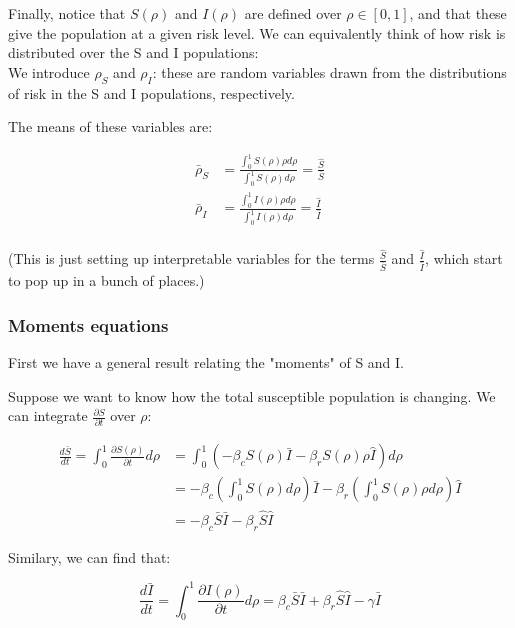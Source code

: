 \documentclass{article}
\begin{document}
Finally, notice that $S(\rho)$ and $I(\rho)$ are defined over $\rho \in [0, 1]$,
and that these give the population at a given risk level. We can equivalently
think of how risk is distributed over the S and I populations:\\

We introduce $\rho_S$ and $\rho_I$: these are random variables drawn from
the distributions of risk in the S and I populations, respectively.

The means of these variables are:

\begin{align*}
\bar\rho_S
&= \frac{\int_{0}^{1} S(\rho) \rho d\rho}{\int_{0}^{1} S(\rho) d\rho}
= \frac{\hat S}{\bar S}\\
\bar\rho_I
&= \frac{\int_{0}^{1} I(\rho) \rho d\rho}{\int_{0}^{1} I(\rho) d\rho}
= \frac{\hat I}{\bar I}\\
\end{align*}

(This is just setting up interpretable variables for the terms
$\frac{\hat S}{\bar S}$ and $\frac{\hat I}{\bar I}$, which start to pop up
in a bunch of places.)\\


\subsubsection{Moments equations}

First we have a general result relating the "moments" of S and I.


Suppose we want to know how the total susceptible population is changing. We
can integrate $\frac{\partial S}{\partial t}$ over $\rho$:

\begin{align*}
\frac{d \bar{S}}{dt} = \int_{0}^{1} \frac{\partial S(\rho)}{\partial t} d\rho
&= \int_{0}^{1} (-\beta_c S(\rho) \bar I - \beta_r S(\rho) \rho \hat I) d\rho  \\
&= -\beta_c (\int_{0}^{1} S(\rho) d\rho) \bar I
	- \beta_r (\int_{0}^{1} S(\rho) \rho d\rho) \hat I\\
&= -\beta_c \bar S \bar I - \beta_r \hat S \hat I
\end{align*}

Similary, we can find that:

$$\frac{d \bar{I}}{dt} = \int_{0}^{1} \frac{\partial I(\rho)}{\partial t} d\rho
= \beta_c \bar S \bar I + \beta_r \hat S \hat I - \gamma \bar I$$\\
\end{document}
